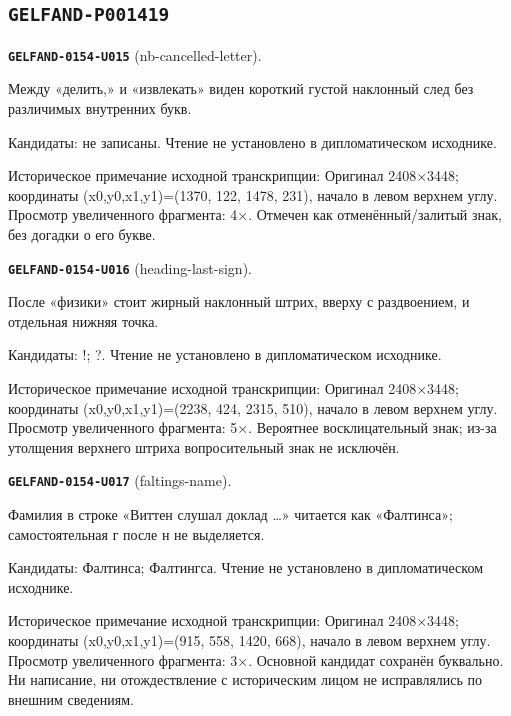 \subsection*{\texttt{GELFAND-P001419}}
\par\noindent\leavevmode{}\label{GELFAND-0154-U015}\textbf{\texttt{GELFAND-0154-U015}} (nb-cancelled-letter).\nopagebreak[4]\par
Между «делить,» и «извлекать» виден короткий густой наклонный след без различимых внутренних букв.\par
Кандидаты: не записаны. Чтение не установлено в дипломатическом исходнике.\par
Историческое примечание исходной транскрипции: Оригинал 2408×3448; координаты (x0,y0,x1,y1)=(1370, 122, 1478, 231), начало в левом верхнем углу. Просмотр увеличенного фрагмента: 4×. Отмечен как отменённый/залитый знак, без догадки о его букве.\par\medskip
\par\noindent\leavevmode{}\label{GELFAND-0154-U016}\textbf{\texttt{GELFAND-0154-U016}} (heading-last-sign).\nopagebreak[4]\par
После «физики» стоит жирный наклонный штрих, вверху с раздвоением, и отдельная нижняя точка.\par
Кандидаты: !; ?. Чтение не установлено в дипломатическом исходнике.\par
Историческое примечание исходной транскрипции: Оригинал 2408×3448; координаты (x0,y0,x1,y1)=(2238, 424, 2315, 510), начало в левом верхнем углу. Просмотр увеличенного фрагмента: 5×. Вероятнее восклицательный знак; из-за утолщения верхнего штриха вопросительный знак не исключён.\par\medskip
\par\noindent\leavevmode{}\label{GELFAND-0154-U017}\textbf{\texttt{GELFAND-0154-U017}} (faltings-name).\nopagebreak[4]\par
Фамилия в строке «Виттен слушал доклад …» читается как «Фалтинса»; самостоятельная г после н не выделяется.\par
Кандидаты: Фалтинса; Фалтингса. Чтение не установлено в дипломатическом исходнике.\par
Историческое примечание исходной транскрипции: Оригинал 2408×3448; координаты (x0,y0,x1,y1)=(915, 558, 1420, 668), начало в левом верхнем углу. Просмотр увеличенного фрагмента: 3×. Основной кандидат сохранён буквально. Ни написание, ни отождествление с историческим лицом не исправлялись по внешним сведениям.\par\medskip
